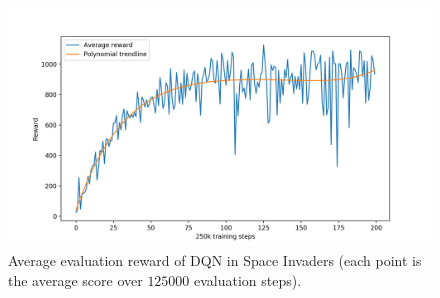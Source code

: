 \begin{figure}
    \includegraphics[width=\textwidth]{pictures/experiments/baseline_space_invaders}
    \centering
    \caption[Average performance of DQN in Space Invaders]{Average evaluation reward 
	    of DQN in Space Invaders (each point is the average score over $125000$
	    evaluation steps).}
    \label{f:SI_baseline}
\end{figure}
%

